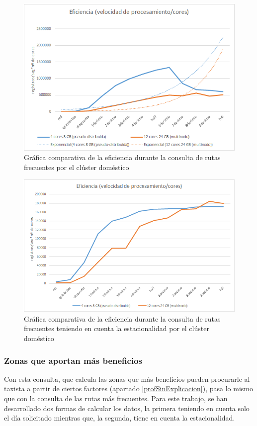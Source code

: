 \begin{figure}[htp!]
	\centering
	\caption{Gráfica comparativa de la eficiencia durante la consulta de rutas frecuentes por el clúster doméstico}
	\label{gra:efiFreqDom}
	\vspace{5pt}
	\includegraphics[scale=0.9]{graficas/efdom}
\end{figure}
\begin{figure}[htp!]
	\centering
	\caption{Gráfica comparativa de la eficiencia durante la consulta de rutas frecuentes teniendo en cuenta la estacionalidad por el clúster doméstico}
	\label{gra:efiFreqDayDom}
	\vspace{5pt}
	\includegraphics[scale=0.85]{graficas/efddom}
\end{figure}

\subsubsection{Zonas que aportan más beneficios}
Con esta consulta, que calcula las zonas que más beneficios pueden procurarle al taxista a partir de ciertos factores (apartado \ref{profSinExplicacion}), pasa lo mismo que con la consulta de las rutas más frecuentes. Para este trabajo, se han desarrollado dos formas de calcular los datos, la primera teniendo en cuenta solo el día solicitado mientras que, la segunda, tiene en cuenta la estacionalidad.

